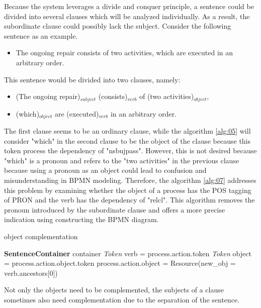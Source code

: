 Because the system leverages a divide and conquer principle, a sentence could be divided into several clauses which will be analyzed individually. As a result, the subordinate clause could possibly lack the subject. Consider the following sentence as an example.

\begin{itemize}
    \item The ongoing repair consists of two activities, which are executed in an arbitrary order.
\end{itemize}

This sentence would be divided into two clauses, namely: 

\begin{itemize}
    \item (The ongoing repair)$_{subject}$ (consists)$_{verb}$ of (two activities)$_{object}$, 
    \item (which)$_{object}$ are (executed)$_{verb}$ in an arbitrary order.
\end{itemize}

The first clause seems to be an ordinary clause, while the algorithm \ref{alg:05} will consider "which" in the second clause to be the object of the clause because this token process the dependency of "nsbujpass". However, this is not desired because "which" is a pronoun and refers to the "two activities" in the previous clause because using a pronoun as an object could lead to confusion and misunderstanding in BPMN modeling. Therefore, the algorithm \ref{alg:07} addresses this problem by examining whether the object of a process has the POS tagging of PRON and the verb has the dependency of "relcl". This algorithm removes the pronoun introduced by the subordinate clause and offers a more precise indication using constructing the BPMN diagram.

\begin{algorithm}
\caption{object complementation}
\label{alg:07}
	\begin{algorithmic} [1]
		\REQUIRE \textbf{SentenceContainer} container
		\STATE \textit{Token} verb = process.action.token
		\STATE \textit{Token} object = process.action.object.token
		\STATE process.action.object = Resource(new\_obj = verb.ancestors[0])
		\ENDIF
		\ENDFOR
	\end{algorithmic}
\end{algorithm}

Not only the objects need to be complemented, the subjects of a clause sometimes also need complementation due to the separation of the sentence. 

